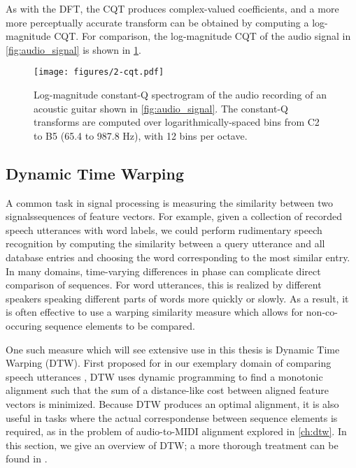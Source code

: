 As with the DFT, the CQT produces complex-valued coefficients, and a more more perceptually accurate transform can be obtained by computing a log-magnitude CQT.
For comparison, the log-magnitude CQT of the audio signal in \cref{fig:audio_signal} is shown in \cref{fig:cqt}.

\begin{figure}
  \centering
  \texttt{[image: figures/2-cqt.pdf]}
  \caption[Log-magnitude constant-Q spectrogram of the acoustic guitar recording]{Log-magnitude constant-Q spectrogram of the audio recording of an acoustic guitar shown in \cref{fig:audio_signal}.
  The constant-Q transforms are computed over logarithmically-spaced bins from C2 to B5 (65.4 to 987.8 Hz), with 12 bins per octave.}
  \label{fig:cqt}
\end{figure}

\subsection{Dynamic Time Warping}
\label{sec:dtw}

A common task in signal processing is measuring the similarity between two signalssequences of feature vectors.
For example, given a collection of recorded speech utterances with word labels, we could perform rudimentary speech recognition by computing the similarity between a query utterance and all database entries and choosing the word corresponding to the most similar entry.
In many domains, time-varying differences in phase can complicate direct comparison of sequences.
For word utterances, this is realized by different speakers speaking different parts of words more quickly or slowly.
As a result, it is often effective to use a warping similarity measure which allows for non-co-occuring sequence elements to be compared.

One such measure which will see extensive use in this thesis is Dynamic Time Warping (DTW).
First proposed for in our exemplary domain of comparing speech utterances \cite{sakoe1978dynamic}, DTW uses dynamic programming to find a monotonic alignment such that the sum of a distance-like cost between aligned feature vectors is minimized.
Because DTW produces an optimal alignment, it is also useful in tasks where the actual correspondense between sequence elements is required, as in the problem of audio-to-MIDI alignment explored in \cref{ch:dtw}.
In this section, we give an overview of DTW; a more thorough treatment can be found in \cite{muller2007dynamic}.

